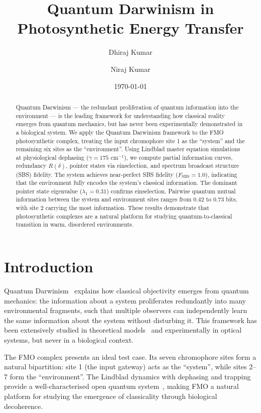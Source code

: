 \documentclass[aps,njp,twocolumn,showpacs,superscriptaddress]{revtex4-2}
\begin{document}
\title{Quantum Darwinism in Photosynthetic Energy Transfer}

\author{Dhiraj Kumar}
\author{Niraj Kumar}
\affiliation{}

\date{\today}

\begin{abstract}
Quantum Darwinism --- the redundant proliferation of quantum information into the environment --- is the leading framework for understanding how classical reality emerges from quantum mechanics, but has never been experimentally demonstrated in a biological system. We apply the Quantum Darwinism framework to the FMO photosynthetic complex, treating the input chromophore site 1 as the ``system'' and the remaining six sites as the ``environment''. Using Lindblad master equation simulations at physiological dephasing ($\gamma = 175$ cm$^{-1}$), we compute partial information curves, redundancy $R(\delta)$, pointer states via einselection, and spectrum broadcast structure (SBS) fidelity. The system achieves near-perfect SBS fidelity ($F_{\mathrm{SBS}} = 1.0$), indicating that the environment fully encodes the system's classical information. The dominant pointer state eigenvalue ($\lambda_1 = 0.31$) confirms einselection. Pairwise quantum mutual information between the system and environment sites ranges from $0.42$ to $0.73$ bits, with site 2 carrying the most information. These results demonstrate that photosynthetic complexes are a natural platform for studying quantum-to-classical transition in warm, disordered environments.
\end{abstract}

\maketitle

\section{Introduction}

Quantum Darwinism~\cite{Zurek2003} explains how classical objectivity emerges from quantum mechanics: the information about a system proliferates redundantly into many environmental fragments, such that multiple observers can independently learn the same information about the system without disturbing it. This framework has been extensively studied in theoretical models~\cite{Horodecki2015} and experimentally in optical systems, but never in a biological context.

The FMO complex presents an ideal test case. Its seven chromophore sites form a natural bipartition: site 1 (the input gateway) acts as the ``system'', while sites 2--7 form the ``environment''. The Lindblad dynamics with dephasing and trapping provide a well-characterised open quantum system~\cite{Mohseni2008}, making FMO a natural platform for studying the emergence of classicality through biological decoherence.
\end{document}
